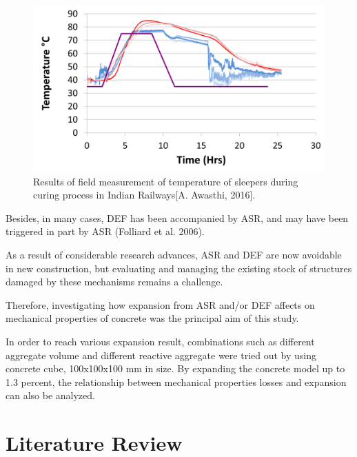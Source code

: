     \begin{figure}[ht!]
        \centering
        \includegraphics[width=.8\linewidth]{Files/Background/Anupam_2.png}
        \caption{Results of field measurement of temperature
 of sleepers during curing process in Indian Railways[A. Awasthi, 2016].}
        \label{fig:Awasthi_2}
    \end{figure}

Besides, in many cases, DEF has been accompanied by ASR, and may have been triggered in part by ASR (Folliard et al. 2006).

As a result of considerable research advances, ASR and DEF are now avoidable in new construction, but evaluating and managing the existing stock of structures damaged by these mechanisms remains a challenge.

Therefore, investigating how expansion from ASR and/or DEF affects on mechanical properties of concrete was the principal aim of this study.

In order to reach various expansion result, combinations such as different aggregate volume and different reactive aggregate were tried out by using concrete cube, 100x100x100 mm in size. By expanding the concrete model up to 1.3 percent, the relationship between mechanical properties losses and expansion can also be analyzed.

\section{Literature Review}

